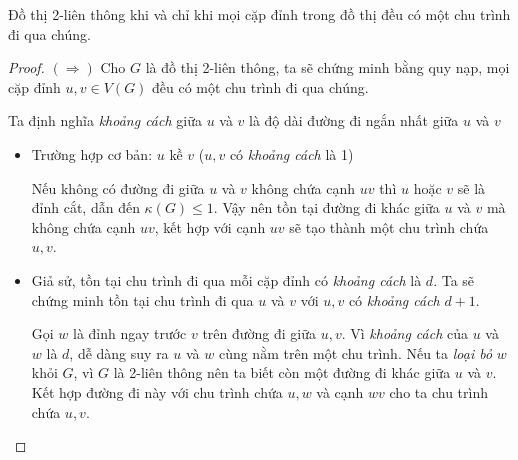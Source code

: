 \begin{lemma}
    Đồ thị 2-liên thông khi và chỉ khi mọi cặp đỉnh trong đồ thị đều có một chu trình đi qua chúng.
    \begin{proof}
        $(\Rightarrow)$ Cho $G$ là đồ thị 2-liên thông, ta sẽ chứng minh bằng quy nạp, mọi cặp đỉnh $u,v \in V(G)$ đều có một chu trình đi qua chúng.

        Ta định nghĩa \textit{khoảng cách} giữa $u$ và $v$ là độ dài đường đi ngắn nhất giữa $u$ và $v$

        \begin{itemize}
            \item Trường hợp cơ bản: $u$ kề $v$ ($u,v$ có \textit{khoảng cách} là 1)
                  \begin{center}
                  \end{center}
                  Nếu không có đường đi giữa $u$ và $v$ không chứa cạnh $uv$ thì $u$ hoặc $v$ sẽ là đỉnh cắt, dẫn đến $\kappa(G) \leq 1$.
                  Vậy nên tồn tại đường đi khác giữa $u$ và $v$ mà không chứa cạnh $uv$, kết hợp với cạnh $uv$ sẽ tạo thành một chu trình chứa $u,v$.

            \item \indent Giả sử, tồn tại chu trình đi qua mỗi cặp đỉnh có \textit{khoảng cách} là $d$. Ta sẽ chứng minh tồn tại chu trình đi qua $u$ và $v$ với $u,v$ có \textit{khoảng cách} $d+1$.

                  Gọi $w$ là đỉnh ngay trước $v$ trên đường đi giữa $u,v$. Vì \textit{khoảng cách} của $u$ và $w$ là $d$, dễ dàng suy ra $u$ và $w$ cùng nằm trên một chu trình.
                  Nếu ta \textit{loại bỏ} $w$ khỏi $G$, vì $G$ là 2-liên thông nên ta biết còn một đường đi khác giữa $u$ và $v$. Kết hợp đường đi này với chu trình chứa $u,w$ và cạnh $wv$ cho ta chu trình chứa $u,v$.


\end{itemize}
\end{proof}
\end{lemma}

